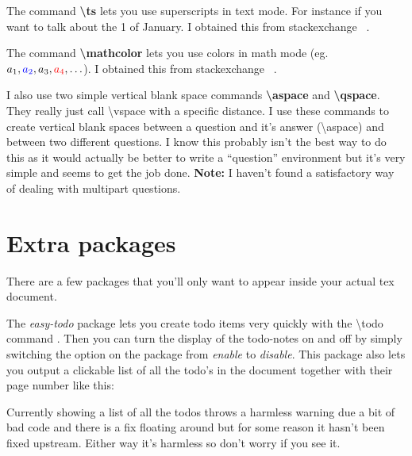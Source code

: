     The command \textbf{\textbackslash ts} lets you use superscripts in text mode. For instance if you want to talk about the 1 of January. I obtained this from stackexchange ~\cite{textsup}.

    The command \textbf{\textbackslash mathcolor} lets you use colors in math mode (eg. $a_1,\mathcolor{blue}{a_2},a_3,\mathcolor{red}{a_4},\ldots$). I obtained this from stackexchange ~\cite{mathcolor}.

    I also use two simple vertical blank space commands \textbf{\textbackslash aspace} and \textbf{\textbackslash qspace}. They really just call \textbackslash vspace with a specific distance. I use these commands to create vertical blank spaces between a question and it's answer (\textbackslash aspace) and between two different questions. I know this probably isn't the best way to do this as it would actually be better to write a ``question'' environment but it's very simple and seems to get the job done. \textbf{Note:} I haven't found a satisfactory way of dealing with multipart questions.

  \section{Extra packages}
    There are a few packages that you'll only want to appear inside your actual tex document.
    
    The \textit{easy-todo} package lets you create todo items very quickly with the \textbackslash todo command . Then you can turn the display of the todo-notes on and off by simply switching the option on the package from \textit{enable} to \textit{disable}. This package also lets you output a clickable list of all the todo's in the document together with their page number like this:

    \listoftodos

    Currently showing a list of all the todos throws a harmless warning due a bit of bad code and there is a fix floating around but for some reason it hasn't been fixed upstream. Either way it's harmless so don't worry if you see it.


